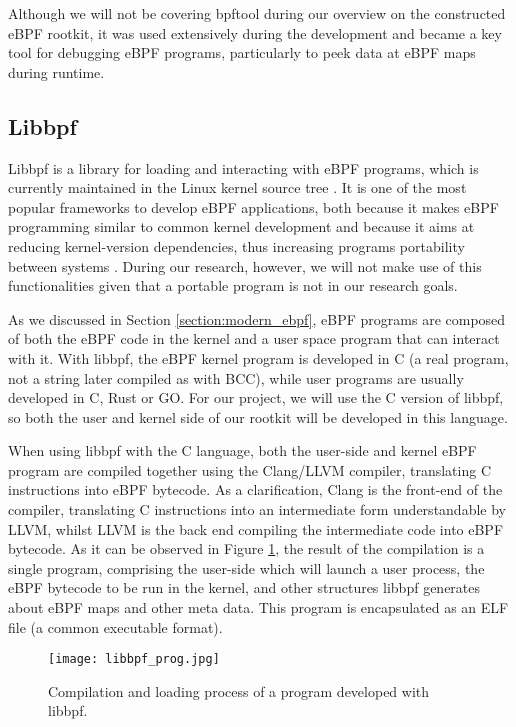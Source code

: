 Although we will not be covering bpftool during our overview on the constructed eBPF rootkit, it was used extensively during the development and became a key tool for debugging eBPF programs, particularly to peek data at eBPF maps during runtime.

\subsection{Libbpf} \label{subsection:libbpf}
Libbpf \cite{libbpf_github} is a library for loading and interacting with eBPF programs, which is currently maintained in the Linux kernel source tree \cite{libbpf_upstream}. It is one of the most popular frameworks to develop eBPF applications, both because it makes eBPF programming similar to common kernel development and because it aims at reducing kernel-version dependencies, thus increasing programs portability between systems \cite{libbpf_core}. During our research, however, we will not make use of this functionalities given that a portable program is not in our research goals.

As we discussed in Section \ref{section:modern_ebpf}, eBPF programs are composed of both the eBPF code in the kernel and a user space program that can interact with it. With libbpf, the eBPF kernel program is developed in C (a real program, not a string later compiled as with BCC), while user programs are usually developed in C, Rust or GO. For our project, we will use the C version of libbpf, so both the user and kernel side of our rootkit will be developed in this language.

When using libbpf with the C language, both the user-side and kernel eBPF program are compiled together using the Clang/LLVM compiler, translating C instructions into eBPF bytecode. As a clarification, Clang is the front-end of the compiler, translating C instructions into an intermediate form understandable by LLVM, whilst LLVM is the back end compiling the intermediate code into eBPF bytecode. As it can be observed in Figure \ref{fig:libbpf}, the result of the compilation is a single program, comprising the user-side which will launch a user process, the eBPF bytecode to be run in the kernel, and other structures libbpf generates about eBPF maps and other meta data. This program is encapsulated as an ELF file (a common executable format).

\begin{figure}[htbp]
	\centering
	\texttt{[image: libbpf\_prog.jpg]}
	\caption{Compilation and loading process of a program developed with libbpf.}
	\label{fig:libbpf}
\end{figure}

